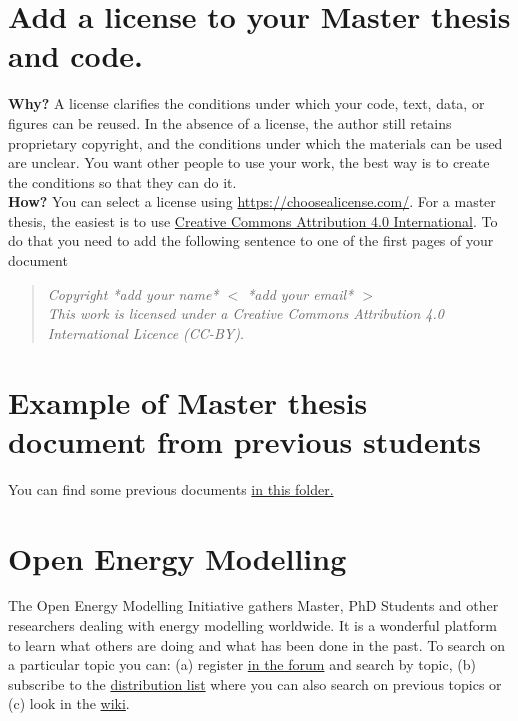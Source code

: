 \documentclass[3p]{elsarticle} %
\begin{document}
\section{Add a license to your Master thesis and code.}
 
\textbf{Why?} A license clarifies the conditions under which your code, text, data, or figures can be reused. In the absence of a license, the author still retains proprietary copyright, and the conditions under which the materials can be used are unclear. You want other people to use your work, the best way is to create the conditions so that they can do it. \\

\textbf{How?} You can select a license using \href{https://choosealicense.com/}{https://choosealicense.com/}. For a master thesis, the easiest is to use \href{https://creativecommons.org/licenses/by/4.0/}{Creative Commons Attribution 4.0 International}. To do that you need to add the following sentence to one of the first pages of your document
\begin{quote}

\textit{Copyright   *add your name* $<$ *add your email* $>$ \\
This work is licensed under a Creative Commons Attribution 4.0 International Licence (CC-BY).}

\end{quote}

\section{Example of Master thesis document from previous students}
You can find some previous documents \href{https://aarhusuniversitet-my.sharepoint.com/:f:/g/personal/au173126_uni_au_dk/EplZk7OAKDNCh5F4E4jlp64B-A3_3nq2EMvauuPGOXWIcg?e=mLnWIw}{in this folder.}

\section{Open Energy Modelling}

The Open Energy Modelling Initiative gathers Master, PhD Students and other researchers dealing with energy modelling worldwide. It is a wonderful platform to learn what others are doing and what has been done in the past. To search on a particular topic you can: (a) register \href{https://forum.openmod-initiative.org/}{in the forum} and search by topic, (b) subscribe to the \href{https://groups.google.com/forum/#!forum/openmod-initiative/home}{distribution list} where you can also search on previous topics or (c) look in the \href{https://wiki.openmod-initiative.org/wiki}{wiki}. 
\end{document}
